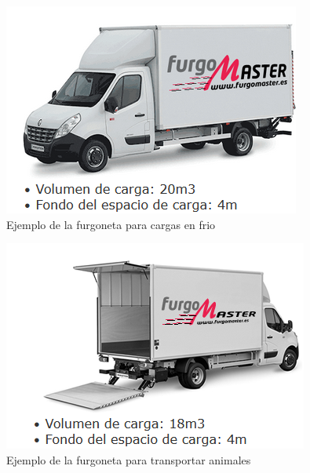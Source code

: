 \begin{figure}[H]
  \centering
  \includegraphics[scale=0.50]{imaxes/FurgonetaFrio.png}
  \caption{\label{fig:FurgonetaFrio}Ejemplo de la furgoneta para cargas en frio}
\end{figure}

\begin{figure}[H]
  \centering
  \includegraphics[scale=0.50]{imaxes/FurgonetaAnimales.png}
  \caption{\label{fig:FurgonetaAnimales}Ejemplo de la furgoneta para transportar animales}
\end{figure}

